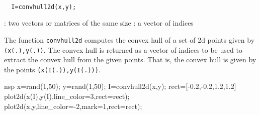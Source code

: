 \begin{mandesc}
  \\
\end{mandesc}
\begin{calling_sequence}
\begin{verbatim}
  I=convhull2d(x,y);
\end{verbatim}
\end{calling_sequence}
\begin{parameters}
  \begin{varlist}
    : two vectors or matrices of the same size
    : a vector of indices 
  \end{varlist}
\end{parameters}

\begin{mandescription}
  The function \verb+convhull2d+ computes the convex hull of 
  a set of 2d points given by \verb!(x(.),y(.))!. The convex 
  hull is returned as a vector of indices to be used to extract 
  the convex hull from the given points. That is, the convex hull 
  is given by the points \verb!(x(I(.)),y(I(.)))!.
\end{mandescription}
\begin{examples}
  \begin{mintednsp}{nsp}
    x=rand(1,50);
    y=rand(1,50);
    I=convhull2d(x,y);
    rect=[-0.2,-0.2,1.2,1.2]
    plot2d(x(I),y(I),line_color=3,rect=rect);
    plot2d(x,y,line_color=-2,mark=1,rect=rect);
  \end{mintednsp}
\end{examples}

